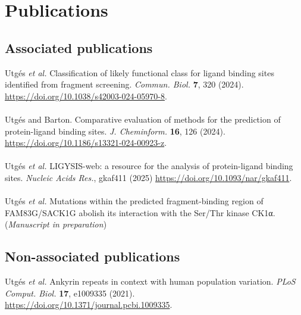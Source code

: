 \chapter*{Publications}

\section*{Associated publications}

Utgés \textit{et al.} Classification of likely functional class for ligand binding sites identified from fragment screening. \textit{Commun. Biol.} \textbf{7}, 320 (2024). \url{https://doi.org/10.1038/s42003-024-05970-8}.
\\\\ 
\noindent
Utgés and Barton. Comparative evaluation of methods for the prediction of protein-ligand binding sites. \textit{J. Cheminform.} \textbf{16}, 126 (2024). \url{https://doi.org/10.1186/s13321-024-00923-z}.
\\\\ 
\noindent
Utgés \textit{et al.} LIGYSIS-web: a resource for the analysis of protein-ligand binding sites. \textit{Nucleic Acids Res.}, gkaf411 (2025) \url{https://doi.org/10.1093/nar/gkaf411}.
\\\\ 
\noindent
Utgés \textit{et al.} Mutations within the predicted fragment-binding region of FAM83G/SACK1G abolish its interaction with the Ser/Thr kinase CK1α. (\textit{Manuscript in preparation})

\section*{Non-associated publications}

Utgés \textit{et al.} Ankyrin repeats in context with human population variation. \textit{PLoS Comput. Biol.} \textbf{17}, e1009335 (2021). \url{https://doi.org/10.1371/journal.pcbi.1009335}.